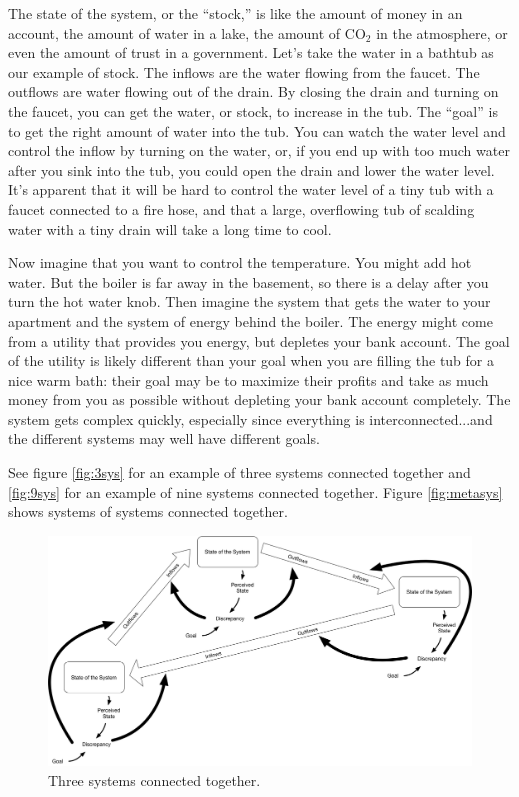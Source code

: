 The state of the system, or the ``stock,'' is like the amount of money in an account, the amount of water in a lake, the amount of CO$_2$ in the atmosphere, or even the amount of trust in a government. Let's take the water in a bathtub as our example of stock. The inflows are the water flowing from the faucet. The outflows are water flowing out of the drain. By closing the drain and turning on the faucet, you can get the water, or stock, to increase in the tub. The ``goal'' is to get the right amount of water into the tub. You can watch the water level and control the inflow by turning on the water, or, if you end up with too much water after you sink into the tub, you could open the drain and lower the water level. It's apparent that it will be hard to control the water level of a tiny tub with a faucet connected to a fire hose, and that a large, overflowing tub of scalding water with a tiny drain will take a long time to cool.

Now imagine that you want to control the temperature. You might add hot water. But the boiler is far away in the basement,  so there is a delay after you turn the hot water knob. Then imagine the system that gets the water to your apartment and the system of energy behind the boiler. The energy might  come from a utility that provides you energy, but depletes your bank account. The goal of the utility is likely different than your goal when you are filling the tub for a nice warm bath: their goal may be to maximize their profits and take as much money from you as possible without depleting your bank account completely. The system gets complex quickly, especially since everything is interconnected...and the different systems may well have different goals.

See figure \autoref{fig:3sys} for an example of three systems connected together and \autoref{fig:9sys} for an example of nine systems connected together. Figure \autoref{fig:metasys} shows systems of systems connected together.


\begin{figure}[h]
 \centering
 \includegraphics[width=1\textwidth]{pictures/3sys}
 \caption{Three systems connected together.}
 \label{fig:3sys}
\end{figure}

